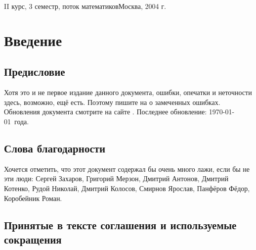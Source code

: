 \documentclass[a4paper]{article}
\begin{document}
{II курс, 3 семестр, поток математиков}{Москва, 2004 г.}

\pagebreak
\tableofcontents
\pagebreak

\section*{Введение}

\subsection*{Предисловие}
Хотя это и не первое издание данного документа, ошибки, опечатки и неточности здесь, возможно, ещё
есть. Поэтому пишите на \dmvnmail{} о замеченных ошибках. Обновления документа
смотрите на сайте \dmvnwebsite{}. Последнее обновление: \today~года.

\subsection*{Слова благодарности}

Хочется отметить, что этот документ содержал бы очень много лажи,
если бы не эти люди: Сергей Захаров, Григорий Мерзон, Дмитрий Антонов, Дмитрий Котенко, Рудой Николай,
Дмитрий Колосов, Смирнов Ярослав, Панфёров Фёдор, Коробейник Роман.

\subsection*{Принятые в тексте соглашения и используемые сокращения}
\end{document}
